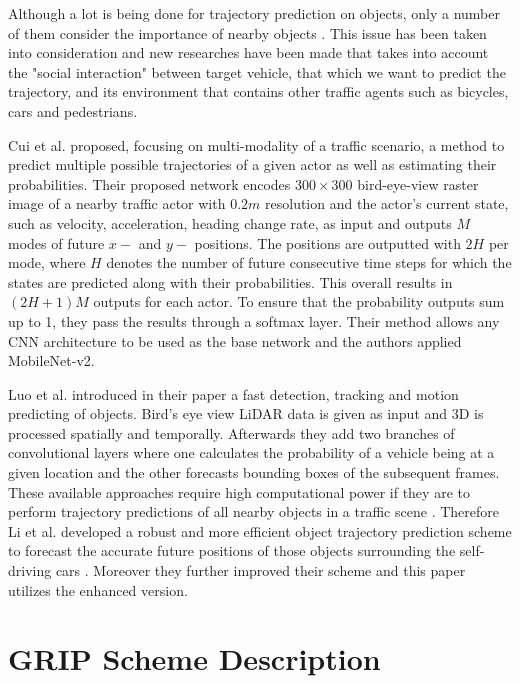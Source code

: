 \tab Although a lot is being done for trajectory prediction on objects, only a number of them consider the importance of nearby objects \cite{2019itsc_grip}. This issue has been taken into consideration and new researches have been made that takes into account the "social interaction" \cite{10397282} between target vehicle, that which we want to predict the trajectory, and its environment that contains other traffic agents such as bicycles, cars and pedestrians. 



\tab Cui et al. \cite{8793868} proposed, focusing on multi-modality of a traffic scenario, a method to predict multiple possible trajectories of a given actor as well as estimating their probabilities. Their proposed network encodes  \(300 \times 300\) bird-eye-view raster image of a nearby traffic actor with \(0.2m\) resolution and the actor's current state, such as velocity, acceleration, heading change rate, as input and outputs \(M\) modes of future \(x-\) and \(y-\) positions. The positions are outputted with \(2H\) per mode, where \(H\) denotes the number of future consecutive time steps for which the states are predicted along with their probabilities. This overall results in \((2H + 1)M\) outputs for each actor. To ensure that the probability outputs sum up to 1, they pass the results through a softmax layer. Their method allows any CNN architecture to be used as the base network and the authors applied MobileNet-v2. 

\tab Luo et al. \cite{luo2020fastfuriousrealtime} introduced in their paper a fast detection, tracking and motion predicting of objects. Bird's eye view LiDAR data is given as input and 3D is processed spatially and temporally. Afterwards they add two branches of convolutional layers where one calculates the probability of a vehicle being at a given location and the other forecasts bounding boxes of the subsequent frames. These available approaches require high computational power if they are to perform trajectory predictions of all nearby objects in a traffic scene \cite{2019itsc_grip}. Therefore Li et al. developed a robust and more efficient object trajectory prediction scheme to forecast the accurate future positions of those objects surrounding the self-driving cars \cite{2019itsc_grip}. Moreover they further improved  their scheme \cite{li2020gripplus} and this paper utilizes the enhanced version.


\section{GRIP Scheme Description}

